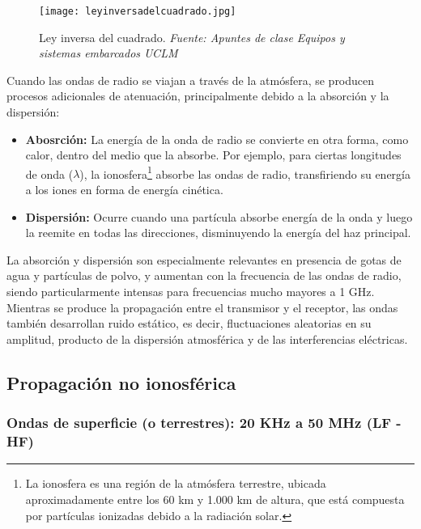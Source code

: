 \begin{figure}[H]
    \centering
    \texttt{[image: leyinversadelcuadrado.jpg]}
    \caption{\centering Ley inversa del cuadrado. \textit{ Fuente: Apuntes de clase Equipos y sistemas embarcados UCLM}}
    \label{fig:placeholder}
\end{figure}

Cuando las ondas de radio se viajan a través de la atmósfera, se producen procesos adicionales de atenuación, principalmente debido a la absorción y la dispersión:\\

\begin{itemize}
\item \textbf{Abosrción:} La energía de la onda de radio se convierte en otra forma, como calor, dentro del medio que la absorbe. Por ejemplo, para ciertas longitudes de onda (\(\lambda\)), la ionosfera\footnote{La ionosfera es una región de la atmósfera terrestre, ubicada aproximadamente entre los 60 km y 1.000 km de altura, que está compuesta por partículas ionizadas debido a la radiación solar.} absorbe las ondas de radio, transfiriendo su energía a los iones en forma de energía cinética.
\item \textbf{Dispersión:} Ocurre cuando una partícula absorbe energía de la onda y luego la reemite en todas las direcciones, disminuyendo la energía del haz principal.\\
\end{itemize}

La absorción y dispersión son especialmente relevantes en presencia de gotas de agua y partículas de polvo, y aumentan con la frecuencia de las ondas de radio, siendo particularmente intensas para frecuencias mucho mayores a 1 GHz.\\

Mientras se produce la propagación entre el transmisor y el receptor, las ondas también desarrollan ruido estático, es decir, fluctuaciones aleatorias en su amplitud, producto de la dispersión atmosférica y de las interferencias eléctricas.\\

 

\subsection{Propagación no ionosférica}
\subsubsection{Ondas de superficie (o terrestres): 20 KHz a 50 MHz (LF - HF)}

